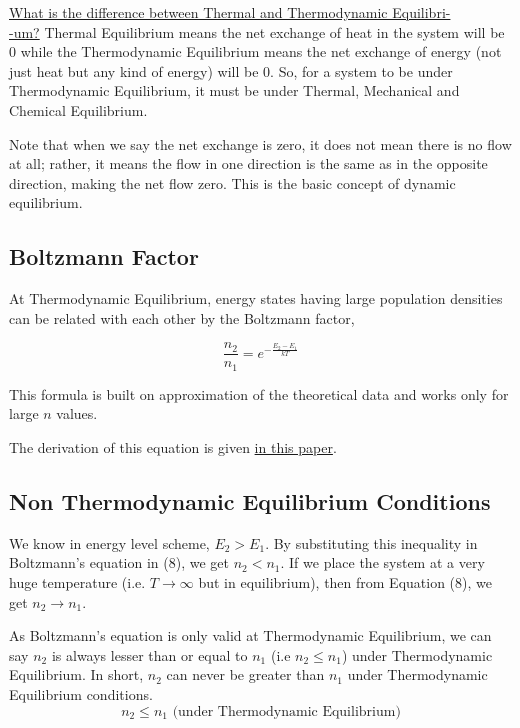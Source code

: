 \documentclass[12pt]{article}
\begin{document}
\uline{What is the difference between Thermal and Thermodynamic Equilibri-\\-um?} Thermal Equilibrium means the net exchange of heat in the system will be 0 while the Thermodynamic Equilibrium means the net exchange of energy (not just heat but any kind of energy) will be 0. So, for a system to be under Thermodynamic Equilibrium, it must be under Thermal, Mechanical and Chemical Equilibrium. \vspace{.2cm}

Note that when we say the net exchange is zero, it does not mean there is no flow at all; rather, it means the flow in one direction is the same as in the opposite direction, making the net flow zero. This is the basic concept of dynamic equilibrium. \vspace{.2cm}

\subsection{Boltzmann Factor}

At Thermodynamic Equilibrium, energy states having large population densities can be related with each other by the Boltzmann factor,

\begin{equation}
    \frac{n_{2}}{n_{1}} = e^{-\frac{E_{2} - E_{1}}{kT}}
\end{equation}

This formula is built on approximation of the theoretical data and works only for large $n$ values. \vspace{.2cm}

The derivation of this equation is given \href{https://www.phys.ufl.edu/~meisel/Boltzmann.pdf}{in this paper}.

\subsection{Non Thermodynamic Equilibrium Conditions}

We know in energy level scheme, $E_{2} > E_{1}$. By substituting this inequality in Boltzmann's equation in (8), we get $n_{2} < n_{1}$. If we place the system at a very huge temperature (i.e. $T \rightarrow \infty$ but in equilibrium), then from Equation (8), we get $n_{2} \rightarrow n_{1}$. \vspace{.2cm}

As Boltzmann's equation is only valid at Thermodynamic Equilibrium, we can say $n_{2}$ is always lesser than or equal to $n_{1}$ (i.e $n_{2} \le n_{1}$) under Thermodynamic Equilibrium. In short, $n_{2}$ can never be greater than $n_{1}$ under Thermodynamic Equilibrium conditions. 
\begin{equation*}
    n_{2} \le n_{1} \text{ (under Thermodynamic Equilibrium)}
\end{equation*}
\end{document}
